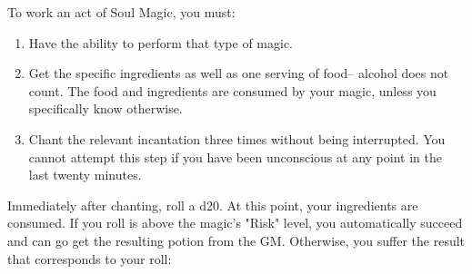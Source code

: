 \documentclass[green]{Kos}
\begin{document}
\name{\gWardSoulMagic{}}


To work an act of Soul Magic, you must:

\begin{enumerate} 
\item Have the ability to perform that type of magic.
\item Get the specific ingredients as well as one serving of food-- alcohol does not count. The food and ingredients are consumed by your magic, unless you specifically know otherwise.
\item Chant the relevant incantation three times without being interrupted. You cannot attempt this step if you have been unconscious at any point in the last twenty minutes.
\end{enumerate}

Immediately after chanting, roll a d20. At this point, your ingredients are consumed. If you roll is above the magic's "Risk" level, you automatically succeed and can go get the resulting potion from the GM. Otherwise, you suffer the result that corresponds to your roll:
\end{document}
